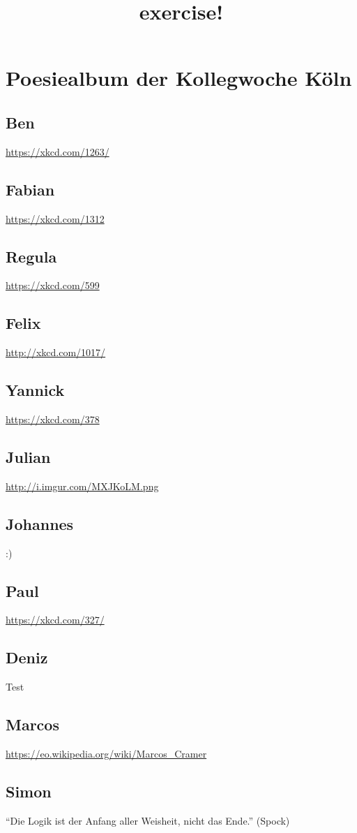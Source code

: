 \documentclass[12pt]{scrartcl}
\begin{document}
\title{exercise!}
\maketitle
\section{Poesiealbum der Kollegwoche Köln}
\subsection{Ben}
\url{https://xkcd.com/1263/}
\subsection{Fabian}
\url{https://xkcd.com/1312}
\subsection{Regula}
\url{https://xkcd.com/599}
\subsection{Felix}
\url{http://xkcd.com/1017/}
\subsection{Yannick}
\url{https://xkcd.com/378}
\subsection{Julian}
\url{http://i.imgur.com/MXJKoLM.png}
\subsection{Johannes}
:)
\subsection{Paul}
\url{https://xkcd.com/327/}

\subsection{Deniz}
Test
\subsection{Marcos}
\url{https://eo.wikipedia.org/wiki/Marcos_Cramer}

\subsection{Simon}
``Die Logik ist der Anfang aller Weisheit, nicht das Ende.'' (Spock)
\end{document}
